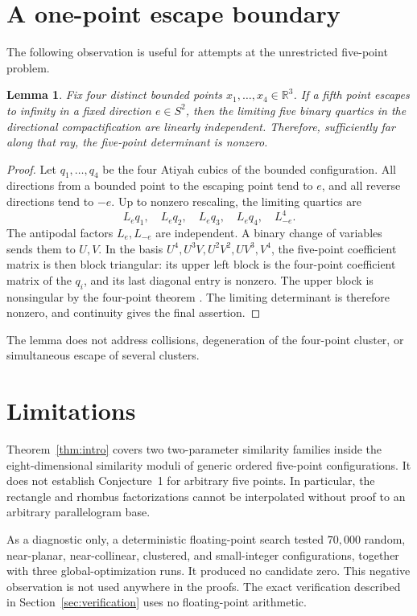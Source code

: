 \documentclass[11pt]{amsart}
\newtheorem{lemma}[theorem]{Lemma}
\theoremstyle{definition}
\newcommand{\R}{\mathbb{R}}
\begin{document}
\section{A one-point escape boundary}\label{sec:escape}

The following observation is useful for attempts at the unrestricted
five-point problem.

\begin{lemma}\label{lem:escape}
Fix four distinct bounded points $x_1,\ldots,x_4\in\R^3$. If a fifth point
escapes to infinity in a fixed direction $e\in S^2$, then the limiting five
binary quartics in the directional compactification are linearly independent.
Therefore, sufficiently far along that ray, the five-point determinant is
nonzero.
\end{lemma}

\begin{proof}
Let $q_1,\ldots,q_4$ be the four Atiyah cubics of the bounded configuration.
All directions from a bounded point to the escaping point tend to $e$, and
all reverse directions tend to $-e$. Up to nonzero rescaling, the limiting
quartics are
\[
L_eq_1,\quad L_eq_2,\quad L_eq_3,\quad L_eq_4,\quad L_{-e}^4.
\]
The antipodal factors $L_e,L_{-e}$ are independent. A binary change of
variables sends them to $U,V$. In the basis
$U^4,U^3V,U^2V^2,UV^3,V^4$, the five-point coefficient matrix is then block
triangular: its upper left block is the four-point coefficient matrix of the
$q_i$, and its last diagonal entry is nonzero. The upper block is nonsingular
by the four-point theorem \cite{EastwoodNorbury2001}. The limiting
determinant is therefore nonzero, and continuity gives the final assertion.
\end{proof}

The lemma does not address collisions, degeneration of the four-point
cluster, or simultaneous escape of several clusters.

\section{Limitations}

Theorem~\ref{thm:intro} covers two two-parameter similarity families inside
the eight-dimensional similarity moduli of generic ordered five-point
configurations. It does not establish Conjecture~1 for arbitrary five
points. In particular, the rectangle and rhombus factorizations cannot be
interpolated without proof to an arbitrary parallelogram base.

As a diagnostic only, a deterministic floating-point search tested $70{,}000$
random, near-planar, near-collinear, clustered, and small-integer
configurations, together with three global-optimization runs. It produced no
candidate zero. This negative observation is not used anywhere in the
proofs. The exact verification described in Section~\ref{sec:verification}
uses no floating-point arithmetic.
\end{document}
